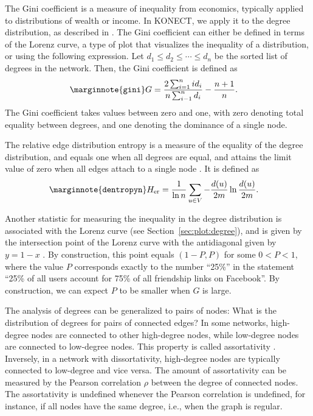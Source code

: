 \documentclass{article}
\begin{document}
The Gini coefficient is a measure of inequality from economics,
typically applied to distributions of wealth or income.  In KONECT, we
apply it to the degree distribution, as described in
\cite{kunegis:power-law}.  The Gini coefficient can either be defined in
terms of the Lorenz curve, a type of plot that visualizes the inequality
of a distribution, or using the following expression.  Let $d_1 \leq d_2
\leq \dotsb \leq d_{n}$ be the sorted list of degrees in the
network. Then, the Gini coefficient is defined as
\begin{align}
  \marginnote{\texttt{gini}} G &= \frac {2 \sum_{i=1}^{n} i d_i} {n
    \sum_{i-1}^{n} d_i} - \frac {n+1} {n}.
\end{align}
The Gini coefficient takes values between zero and one, with zero
denoting total equality between degrees, and one denoting the dominance
of a single node.

The relative edge distribution entropy is a measure of the equality of
the degree distribution, and equals one when all degrees are equal, and
attains the limit value of zero when all edges attach to a single node
\cite{kunegis:power-law}.  It is defined as
\begin{align}
  \marginnote{\texttt{dentropyn}} H_{\mathrm{er}} &= \frac 1 {\ln n}
  \sum_{u \in V} - \frac{d(u)}{2m} \ln \frac{d(u)}{2m}.
\end{align}

Another statistic for  measuring the inequality
in the degree distribution is associated with the Lorenz curve (see
Section~\ref{sec:plot:degree}), and is given by the intersection point
of the Lorenz curve with the antidiagonal given by $y = 1 - x$
\cite{kunegis:power-law}.  By construction, this point equals $(1-P, P)$
for some $0<P<1$, where the value $P$ corresponds exactly to the number
``25\%'' in the statement ``25\% of all users account for 75\% of all
friendship links on Facebook''.  By construction, we can expect $P$ to
be smaller when $G$ is large.

The analysis of degrees can be generalized to pairs of nodes:  What is
the distribution of degrees for pairs of connected edges?  In some
networks, high-degree nodes are connected to other high-degree nodes,
while low-degree nodes are connected to low-degree nodes.  This property
is called assortativity \cite{b854}.  Inversely, in a network with dissortativity,
high-degree nodes are typically connected to low-degree and vice versa.
The amount of assortativity can be measured by the Pearson correlation
$\rho$ between the degree of connected nodes.  The assortativity is
undefined whenever the Pearson correlation is undefined, for instance,
if all nodes have the same degree, i.e., when the graph is regular. 
\end{document}
